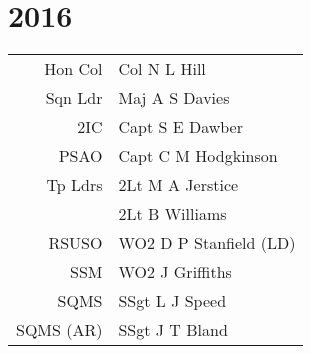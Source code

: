 \chapter*{2016}

\vspace*{10mm}

\begin{center}
  \small
  \begin{tabular}{rl}
    Hon Col & Col N L Hill \\
    Sqn Ldr & Maj A S Davies \\
    2IC & Capt S E Dawber \\
    PSAO & Capt C M Hodgkinson \\
    Tp Ldrs & 2Lt M A Jerstice \\
     & 2Lt B Williams \\
    RSUSO & WO2 D P Stanfield (LD) \\
    SSM & WO2 J Griffiths \\
    SQMS & SSgt L J Speed \\
    SQMS (AR) & SSgt J T Bland \\
  \end{tabular}
\end{center}

\vspace*{5mm}

